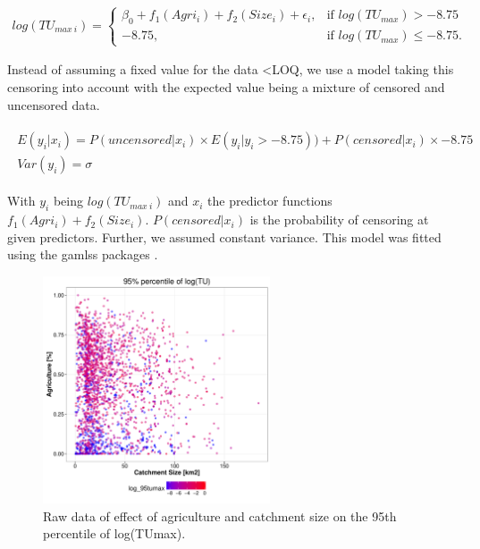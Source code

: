 \documentclass[pdftex,a4paper]{scrreprt}
\begin{document}
\begin{align}
  log(TU_{max~i})=\begin{cases}
    \beta_0 + f_1(Agri_i) + f_2(Size_i) + \epsilon_i, & \text{if $log(TU_{max}) > -8.75 $}\\
    -8.75, & \text{if $log(TU_{max}) \le -8.75 $}.
  \end{cases}
\end{align}


Instead of assuming a fixed value for the data \textless LOQ, we use a model taking this censoring into account \citep{helsel_fabricating_2006} with the expected value being a mixture of censored and uncensored data.

\begin{align}
\begin{split}
	E(y_i | x_i) = P(uncensored|x_i) \times E(y_i | y_i > -8.75)) + P(censored|x_i) \times -8.75\\
	Var(y_i) = \sigma
\end{split}
\end{align}

With $y_i$ being $log(TU_{max~i})$ and $x_i$ the predictor functions $f_1(Agri_i) + f_2(Size_i)$. $P(censored|x_i)$ is the probability of censoring at given predictors. Further, we assumed constant variance. This model was fitted using the gamlss packages \citep{stasinopoulos_generalized_2007}.




\begin{figure}[h]
	\centering
	\includegraphics[width = 0.6\textwidth]{ezgagritu}
	\caption{Raw data of effect of agriculture and catchment size on the 95th percentile of log(TUmax).}
	\label{fig:ezgagritu}
\end{figure}
\end{document}
